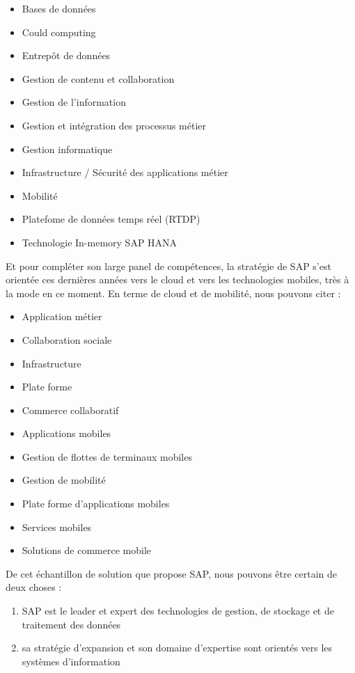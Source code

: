 \begin{itemize}
	\item Bases de données
	\item Could computing
	 \item Entrepôt de données
	 \item Gestion de contenu et collaboration
	 \item Gestion de l'information
	 \item Gestion et intégration des processus métier
	 \item Gestion informatique
	 \item Infrastructure / Sécurité des applications métier
	 \item Mobilité
	 \item Platefome de données temps réel (RTDP)
	 \item Technologie In-memory SAP HANA
\end{itemize}

Et pour compléter son large panel de compétences, la stratégie de SAP s'est orientée ces dernières années vers le cloud et vers les technologies mobiles, très à la mode en ce moment. En terme de cloud et de mobilité, nous pouvons citer :
\begin{itemize}
	\item Application métier
	\item Collaboration sociale
	\item Infrastructure
	\item Plate forme
	\item Commerce collaboratif
	\item Applications mobiles
	\item Gestion de flottes de terminaux mobiles
	\item Gestion de mobilité
	\item Plate forme d'applications mobiles
	\item Services mobiles
	\item Solutions de commerce mobile
\end{itemize}

De cet échantillon de solution que propose SAP, nous pouvons être certain de deux choses :
\begin{enumerate}
	\item SAP est le leader et expert des technologies de gestion, de stockage et de traitement des données
	\item sa stratégie d'expansion et son domaine d'expertise sont orientés vers les systèmes d'information
\end{enumerate}

